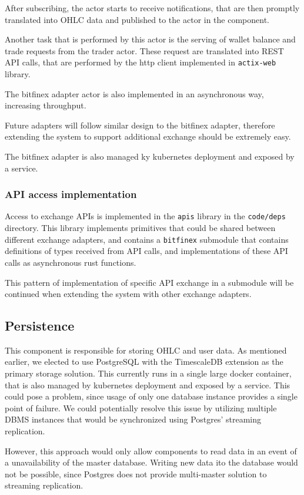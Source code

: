 After subscribing, the actor starts to receive notifications, that are then promptly translated into OHLC data
and published to the  actor in the  component.

Another task that is performed by this actor is the serving of wallet balance and trade requests from the
trader actor. These request are translated into REST API calls, that are performed by the http client implemented
in \verb|actix-web| library.

The bitfinex adapter actor is also implemented in an asynchronous way, increasing throughput.

Future adapters will follow similar design to the bitfinex adapter, therefore
extending the system to support additional exchange should be extremely easy.

The bitfinex adapter is also managed ky kubernetes deployment and exposed by a service.

\subsubsection{API access implementation}
Access to exchange APIs is implemented in the \verb|apis| library in the \verb|code/deps| directory. This library implements
primitives that could be shared between different exchange adapters, and contains a \verb|bitfinex| submodule that contains
definitions of types received from API calls, and implementations of these API calls as  asynchronous rust functions.

This pattern of implementation of specific API exchange in a submodule will be continued when extending the system
with other exchange adapters.


\subsection{Persistence}
This component is responsible for storing OHLC and user data. As mentioned earlier, we elected to use PostgreSQL
with the TimescaleDB extension as the primary storage solution. This currently runs in a single large docker
container, that is also managed by kubernetes deployment and exposed by a service. This could pose a problem,
since usage of only one database instance provides a single point of failure. We could potentially resolve
this issue by utilizing multiple DBMS instances that would be synchronized using Postgres' streaming replication.

However, this approach would only allow components to read data in an event of a unavailability of the master 
database. Writing new data ito the database would not be possible, since Postgres does not provide multi-master
solution to streaming replication.

